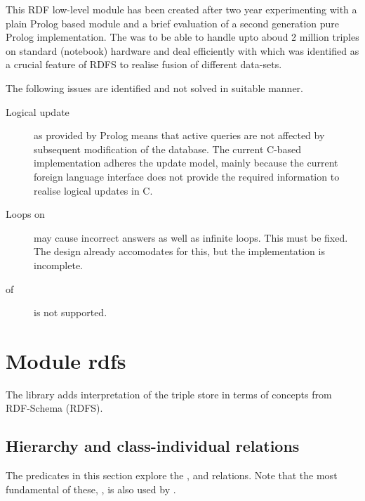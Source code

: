 \documentclass[11pt]{article}
\begin{document}
This RDF low-level module has been created after two year experimenting
with a plain Prolog based module and a brief evaluation of a second
generation pure Prolog implementation. The was to be able to handle upto
aboud 2 million triples on standard (notebook) hardware and deal
efficiently with  which was identified as a
crucial feature of RDFS to realise fusion of different data-sets.

The following issues are identified and not solved in suitable manner.

\begin{description}
    \item [Logical update] as provided by Prolog means that active queries
are not affected by subsequent modification of the database. The current
C-based implementation adheres the  update model,
mainly because the current foreign language interface does not provide
the required information to realise logical updates in C.

    \item [Loops on ] may cause incorrect answers
as well as infinite loops.  This must be fixed.  The design already
accomodates for this, but the implementation is incomplete.

    \item [ of ] is not
supported.
\end{description}



\section{Module rdfs}				\label{sec:rdfs}

%
The  library adds interpretation of the triple store in
terms of concepts from RDF-Schema (RDFS).  

\subsection{Hierarchy and class-individual relations}

The predicates in this section explore the ,
 and  relations.  Note that the
most fundamental of these, , is also used 
by .
\end{document}
